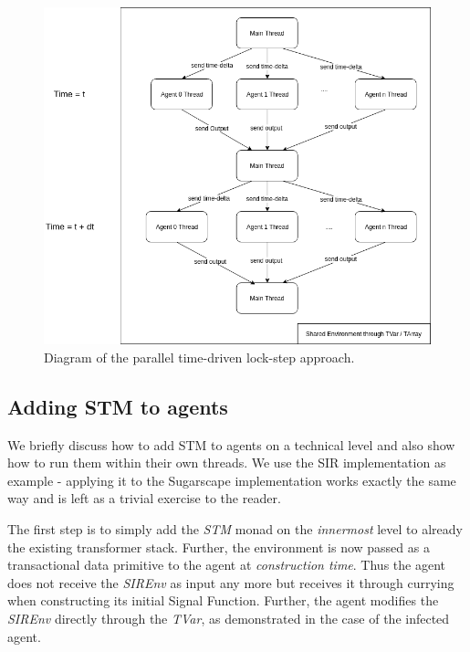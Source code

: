\begin{figure}
	\centering
	\includegraphics[width=1.0\textwidth, angle=0]{./fig/concurrentabs/stm_abs.png}
	\caption{Diagram of the parallel time-driven lock-step approach.}
	\label{fig:stm_abs_structure}
\end{figure}

\subsection{Adding STM to agents}
We briefly discuss how to add STM to agents on a technical level and also show how to run them within their own threads. We use the SIR implementation as example - applying it to the Sugarscape implementation works exactly the same way and is left as a trivial exercise to the reader.

The first step is to simply add the \textit{STM} monad on the \textit{innermost} level to already the existing transformer stack. Further, the environment is now passed as a transactional data primitive to the agent at \textit{construction time}. Thus the agent does not receive the \textit{SIREnv} as input any more but receives it through currying when constructing its initial Signal Function. Further, the agent modifies the \textit{SIREnv} directly through the \textit{TVar}, as demonstrated in the case of the infected agent.

